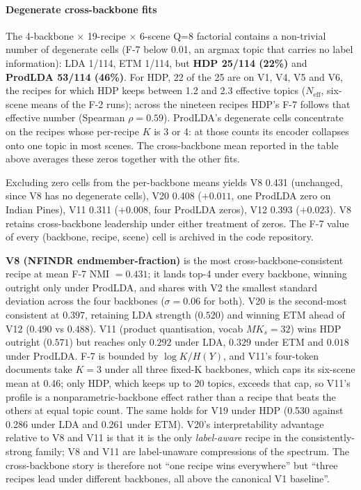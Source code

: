 \documentclass[journal,a4paper,10pt]{IEEEtran}
\begin{document}
\paragraph{Degenerate cross-backbone fits}
The 4-backbone $\times$ 19-recipe $\times$ 6-scene Q=8 factorial
contains a non-trivial number of degenerate cells (F-7 below 0.01, an
argmax topic that carries no label information): LDA 1/114, ETM 1/114,
but \textbf{HDP 25/114 (22\%)} and \textbf{ProdLDA 53/114 (46\%)}. For
HDP, 22 of the 25 are on V1, V4, V5 and V6, the recipes for which HDP
keeps between 1.2 and 2.3 effective topics ($N_{\mathrm{eff}}$,
six-scene means of the F-2 runs); across the nineteen recipes HDP's F-7
follows that effective number (Spearman $\rho = 0.59$). ProdLDA's
degenerate cells concentrate on the recipes whose per-recipe $K$ is 3 or
4: at those counts its encoder collapses onto one topic in most scenes.
The cross-backbone mean
reported in the table above averages these zeros together with the
other fits.

Excluding zero cells from the per-backbone means yields V8 0.431
(unchanged, since V8 has no degenerate cells), V20 0.408 ($+0.011$, one
ProdLDA zero on Indian Pines), V11 0.311 ($+0.008$, four ProdLDA zeros),
V12 0.393 ($+0.023$). V8 retains cross-backbone leadership under either
treatment of zeros. The F-7 value of every (backbone, recipe, scene)
cell is archived in the code repository.

\textbf{V8 (NFINDR endmember-fraction)} is the most
cross-backbone-consistent recipe at mean F-7 NMI $= 0.431$; it lands top-4 under
every backbone, winning outright only under ProdLDA, and shares with V2
the smallest standard deviation across the four backbones
($\sigma = 0.06$ for both). V20
is the second-most consistent at $0.397$, retaining LDA strength
($0.520$) and winning ETM ahead of V12 ($0.490$ vs $0.488$). V11 (product
quantisation, vocab $M K_s = 32$) wins HDP outright ($0.571$) but
reaches only $0.292$ under LDA, $0.329$ under ETM and $0.018$ under
ProdLDA. F-7 is bounded by $\log K / H(Y)$, and V11's four-token
documents take $K = 3$ under all three fixed-K backbones, which caps its
six-scene mean at 0.46; only HDP, which keeps up to 20 topics, exceeds
that cap, so V11's profile is a nonparametric-backbone effect rather
than a recipe that beats the others at equal topic count. The same
holds for V19 under HDP (0.530 against 0.286 under LDA and 0.261 under
ETM).
V20's interpretability advantage relative to V8 and V11 is that it
is the only \emph{label-aware} recipe in the consistently-strong
family; V8 and V11 are label-unaware compressions of the spectrum.
The cross-backbone story is therefore not ``one recipe wins
everywhere'' but ``three recipes lead under different backbones, all
above the canonical V1 baseline''.
\end{document}
